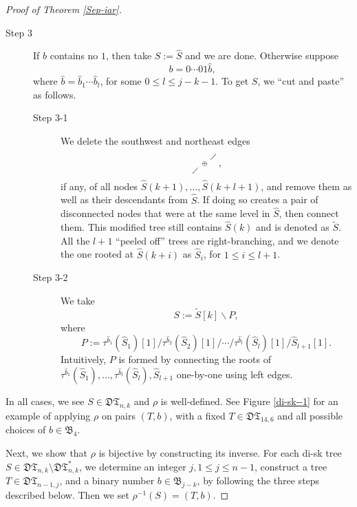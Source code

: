 \documentclass[11pt,reqno]{amsart}
\numberwithin{equation}{section}
\theoremstyle{plain}
\theoremstyle{definition}
\newcommand{\I}{\mathfrak{B}}
\def\DT{\mathfrak{DT}}
\begin{document}
\begin{proof}[Proof of Theorem \ref{Sep-iar}]
\begin{description}
\item[Step 3] If $b$ contains no $1$, then take $S:=\hat{S}$ and we are done. Otherwise suppose $$b=0\cdots 01\hat{b},$$ where $\hat{b}=\hat{b}_1\cdots\hat{b}_{l}$, for some $0\le l\le j-k-1$. To get $S$, we ``cut and paste'' as follows.
\begin{description}
\item[Step 3-1] We delete the southwest and northeast edges $$
    \begin{smallmatrix}
    & & \diagup \\
	& \oplus & \\
	\diagup & & \\
	\end{smallmatrix},$$ if any, of all nodes $\hat{S}(k+1),\ldots,\hat{S}(k+l+1)$, and remove them as well as their descendants from $\hat{S}$. If doing so creates a pair of disconnected nodes that were at the same level in $\hat{S}$, then connect them. This modified tree still contains $\hat{S}(k)$ and is denoted as $\tilde{S}$. All the $l+1$ ``peeled off'' trees are right-branching, and we denote the one rooted at $\hat{S}(k+i)$ as $\hat{S}_{i}$, for $1\le i\le l+1$. 
\item[Step 3-2] We take
$$S:=\tilde{S}[k]\backslash P,$$ where $$P:=\tau^{\hat{b}_1}(\hat{S}_{1})[1]\slash\tau^{\hat{b}_2}(\hat{S}_2)[1]\slash\cdots\slash\tau^{\hat{b}_l}(\hat{S}_l)[1]\slash\hat{S}_{l+1}[1].$$ Intuitively, $P$ is formed by connecting the roots of $\tau^{\hat{b}_1}(\hat{S}_1),\ldots,\tau^{\hat{b}_l}(\hat{S}_l),\hat{S}_{l+1}$ one-by-one using left edges.
\end{description}
\end{description}

In all cases, we see $S\in\mathfrak{DT}_{n,k}$ and $\rho$ is well-defined. See Figure \ref{di-sk--1} for an example of applying $\rho$ on pairs $(T,b)$, with a fixed $T\in\DT_{14,6}$ and all possible choices of $b\in\I_4$.

Next, we show that $\rho$ is bijective by constructing its inverse. For each di-sk tree $S\in\DT_{n,k}\setminus \DT_{n,k}^*$, we determine an integer $j, 1\le j\le n-1$, construct a tree $T\in\mathfrak{DT}_{n-1,j}$, and a binary number $b\in\I_{j-k}$, by following the three steps described below. Then we set $\rho^{-1}(S)=(T,b)$.


\end{proof}
\end{document}
